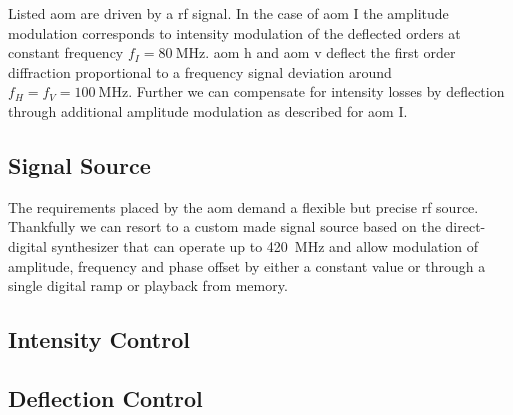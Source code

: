 Listed \gls{aom} are driven by a \gls{rf} signal. In the case of \gls{aom} I
the amplitude modulation corresponds to intensity modulation of the deflected
orders at constant frequency $f_I=\SI{80}{\mega\hertz}$. \gls{aom} \gls{h}
and \gls{aom} \gls{v} deflect the first order diffraction proportional to
a frequency signal deviation around $f_H=f_V=\SI{100}{\mega\hertz}$. Further
we can compensate for intensity losses by deflection through additional
amplitude modulation as described for \gls{aom} I.

\subsection{Signal Source}

The requirements placed by the \gls{aom} demand a flexible but precise
\gls{rf} source. Thankfully we can resort to a custom made signal source
based on the \cite{ad9910} direct-digital synthesizer that can operate up to
\SI{420}{\mega\hertz} and allow modulation of amplitude, frequency and phase
offset by either a constant value or through a single digital ramp or playback
from memory.

\subsection{Intensity Control}


\subsection{Deflection Control}
